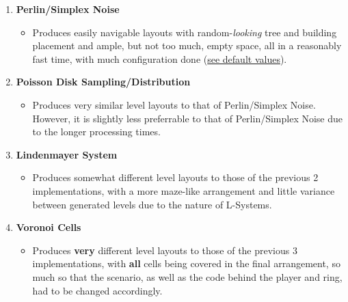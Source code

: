 \begin{enumerate}
    \item \textbf{Perlin/Simplex Noise}
    \begin{itemize}
        \item Produces easily navigable layouts with random-\textit{looking} tree and building placement and ample, but not too much, empty space, all in a reasonably fast time, with much configuration done (\hyperref[noisedefaults]{see default values}).
    \end{itemize}
    \item \textbf{Poisson Disk Sampling/Distribution}
    \begin{itemize}
        \item Produces very similar level layouts to that of Perlin/Simplex Noise. However, it is slightly less preferrable to that of Perlin/Simplex Noise due to the longer processing times.
    \end{itemize}
    \item \textbf{Lindenmayer System}
    \begin{itemize}
        \item Produces somewhat different level layouts to those of the previous 2 implementations, with a more maze-like arrangement and little variance between generated levels due to the nature of L-Systems.
    \end{itemize}
    \item \textbf{Voronoi Cells}
    \begin{itemize}
        \item Produces \textbf{very} different level layouts to those of the previous 3 implementations, with \textbf{all} cells being covered in the final arrangement, so much so that the scenario, as well as the code behind the player and ring, had to be changed accordingly.
    \end{itemize}
\end{enumerate}
